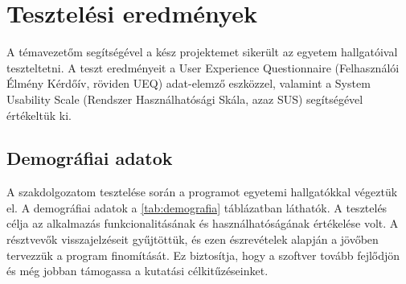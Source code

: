 \chapter{Tesztelési eredmények}

\thispagestyle{fancy}
\pagestyle{fancy}

A témavezetőm segítségével a kész projektemet sikerült az egyetem hallgatóival teszteltetni.
A teszt eredményeit a User Experience Questionnaire (Felhasználói Élmény Kérdőív, röviden UEQ) adat-elemző eszközzel, valamint a System Usability Scale (Rendszer Használhatósági Skála, azaz SUS) segítségével értékeltük ki. 

\section{Demográfiai adatok}
A szakdolgozatom tesztelése során a programot egyetemi hallgatókkal végeztük el. A demográfiai adatok a \ref{tab:demografia} táblázatban láthatók. A tesztelés célja az alkalmazás funkcionalitásának és használhatóságának értékelése volt. A résztvevők visszajelzéseit gyűjtöttük, és ezen észrevételek alapján a jövőben tervezzük a program finomítását. Ez biztosítja, hogy a szoftver tovább fejlődjön és még jobban támogassa a kutatási célkitűzéseinket.

